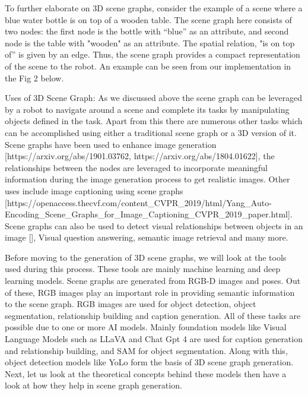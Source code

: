 To further elaborate on 3D scene graphs, consider the example of a scene where a blue water bottle is on top of a wooden table. 
The scene graph here consists of two nodes: 
the first node is the bottle with “blue” as an attribute, and second node is the table with "wooden" as an attribute. The spatial relation, 
"is on top of” is given by an edge. Thus, the scene graph provides a compact representation of the scene to the robot. 
An example can be seen from our implementation in the Fig 2 below.

Uses of 3D Scene Graph:
As we discussed above the scene graph can be leveraged by a robot to navigate around a scene and complete its tasks by manipulating objects defined in the task. 
Apart from this there are numerous other tasks which can be accomplished using either a traditional scene graph or a 3D version of it. 
Scene graphs have been used to enhance image generation [https://arxiv.org/abs/1901.03762, https://arxiv.org/abs/1804.01622], 
the relationships between the nodes are leveraged to incorporate meaningful information during the image generation process to get realistic images.
 Other uses include image captioning using scene graphs 
 [https://openaccess.thecvf.com/content_CVPR_2019/html/Yang_Auto-Encoding_Scene_Graphs_for_Image_Captioning_CVPR_2019_paper.html]. 
 Scene graphs can also be used to detect visual relationships between objects in an image [], Visual question answering, semantic image retrieval and many more.

Before moving to the generation of 3D scene graphs, we will look at the tools used during this process. 
These tools are mainly machine learning and deep learning models. Scene graphs are generated from RGB-D images and poses. 
Out of these, RGB images play an important role in providing semantic information to the scene graph. RGB images are used for object detection,
object segmentation, relationship building and caption generation. All of these tasks are possible due to one or more AI models.
Mainly foundation models like Visual Language Models such as LLaVA and Chat Gpt 4 are used for caption generation and 
relationship building, and SAM for object segmentation. Along with this, object detection models like YoLo form the basis of 
3D scene graph generation. 
Next, let us look at the theoretical concepts behind these models then have a look at how they help in scene graph generation.
